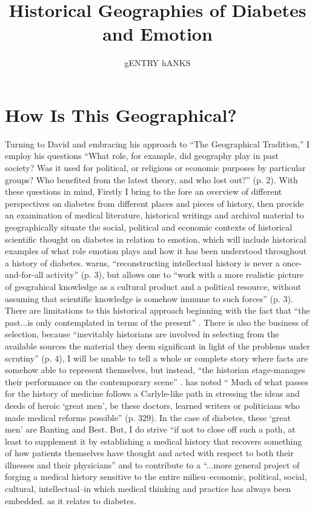 \documentclass[12pt]{article}
\title{Historical Geographies of Diabetes and Emotion}
\author{gENTRY hANKS}
\begin{document}
\maketitle


\newpage
\section{How Is This Geographical?}
\doublespacing
Turning to David \citet{livingstone_geographical_1993} and embracing his approach to ``The Geographical Tradition,'' I employ his questions ``What role, for example, did geography play in past society? Was it used for political, or religious or economic purposes by particular groups? Who benefited from the latest theory, and who lost out?'' (p. 2).  With these questions in mind, Firstly I bring to the fore an overview of different perspectives on diabetes from different places and pieces of history, then provide an examination of medical literature, historical writings and archival material to geographically situate the social, political and economic contexts of historical scientific thought on diabetes in relation to emotion, which will include historical examples of what role emotion plays and how it has been understood throughout a history of diabetes. \citet{livingstone_geographical_1993} warns, ``reconstructing intellectual history is never a once-and-for-all activity'' (p. 3), but allows one to ``work with a more realistic picture of geograhical knowledge as a cultural product and a political resource, without assuming that scientific knowledge is somehow immune to such forces'' (p. 3). There are limitations to this historical approach beginning with the fact that ``the past...is only contemplated in terms of the present'' \citep[p. 3]{livingstone_geographical_1993}. There is also the business of selection, because ``inevitably historians are involved in selecting from the available sources the material they deem significant in light of the problems under scrutiny'' (p. 4), I will be unable to tell a whole or complete story where facts are somehow able to represent themselves, but instead, ``the historian stage-manages their performance on the contemporary scene'' \citep[p. 5]{livingstone_geographical_1993}. \citet{philo_1987_Patients} has noted ``
Much of what passes for the history of medicine follows a Carlyle-like path in stressing the ideas and deeds of heroic `great men', be these doctors, learned writers or politicians who made medical reforms possible'' (p. 329). In the case of diabetes, these `great men' are Banting and Best. But, I do strive ``if not to close off such a path, at least to supplement it by establishing a medical history that recovers something of how patients themselves have thought and acted with respect to both their illnesses and their physicians'' and to contribute to a ``...more general project of forging a medical history sensitive to the entire milieu--economic, political, social, cultural, intellectual--in which medical thinking and practice has always been embedded.\citep[p. 329]{philo_1987_Patients} as it relates to diabetes. 
\end{document}

